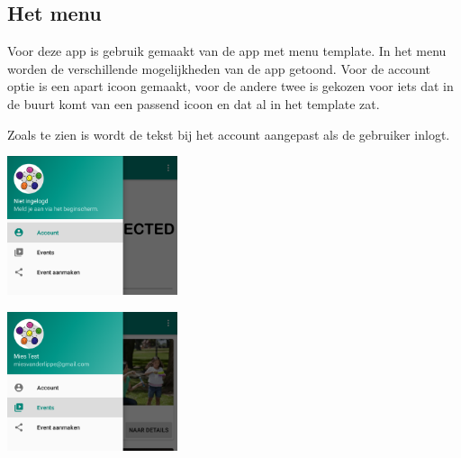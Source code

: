 \documentclass[dutch]{report}
\begin{document}
	
	\subsection{Het menu}
	Voor deze app is gebruik gemaakt van de app met menu template. In het menu worden de verschillende 
	mogelijkheden van de app getoond. Voor de account optie is een apart icoon gemaakt, voor de andere
	twee is gekozen voor iets dat in de buurt komt van een passend icoon en dat al in het template zat. 
	
	Zoals te zien is wordt de tekst bij het account aangepast als de gebruiker inlogt. 
	
	\begin{minipage}{0.50\textwidth}
		\begin{center}
			\includegraphics[width=5cm]{images/nietingelogd.png}		
		\end{center}
	\end{minipage}
	\hfill
	\begin{minipage}{0.50\textwidth}
		\begin{center}
			\includegraphics[width=5cm]{images/ingelogd.png}
		\end{center}
	\end{minipage}
	
	
\end{document}
